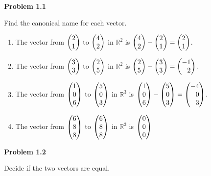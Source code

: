 \documentclass[12pt]{article}
\newenvironment{problem}[1][default]{
  \begin{framed}\begin{minipage}{0.97\textwidth}
  \setlength{\parskip}{4mm}
  {\bf Problem #1}
}{\end{minipage}\end{framed}}
\newenvironment{abc}{\begin{enumerate}[label={\bf(\alph*)}]}{\end{enumerate}}
\newcommand\m[2][]{
	\ifthenelse{\equal {#1} {}}
		{\begin{pmatrix*}[r]#2\end{pmatrix*}}
		{\left(\begin{array}{#1}#2\end{array}\right)}
}
\begin{document}
\begin{problem}[1.1]
	Find the canonical name for each vector.
\end{problem}

\begin{abc}
\item The vector from $ \m{2 \\ 1} $ to $ \m{ 4 \\ 2} $ in $\mathbb{R}^2$ is $ \m{4 \\ 2} - \m{ 2 \\ 1} = \m{2 \\ 1}$.
\item The vector from $ \m{3 \\ 3} $ to $ \m{ 2 \\ 5} $ in $\mathbb{R}^2$ is $ \m{2 \\ 5} - \m{ 3 \\ 3} = \m{-1 \\ 2}$.
\item The vector from $ \m{1 \\ 0 \\ 6} $ to $ \m{ 5 \\ 0 \\ 3} $ in $\mathbb{R}^3$ is $ \m{1 \\ 0 \\ 6} - \m{ 5 \\ 0 \\ 3} = \m{-4 \\ 0 \\ 3}$.
\item The vector from $ \m{6 \\ 8 \\ 8} $ to $ \m{ 6 \\ 8 \\ 8} $ in $\mathbb{R}^3$ is $ \m{0 \\ 0 \\ 0} $
\end{abc}


\begin{problem}[1.2]
	Decide if the two vectors are equal.
\end{problem}
\end{document}
